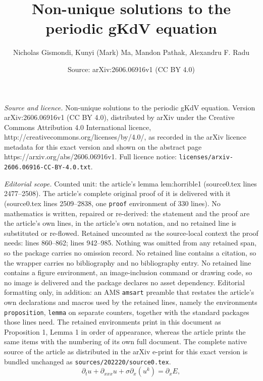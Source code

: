\documentclass[10pt,a4paper]{amsart}
\title{Non-unique solutions to the periodic \textsf{gKdV} equation}
\author{Nicholas Gismondi, Kunyi (Mark) Ma, Mandon Pathak, Alexandru F. Radu}
\date{Source: arXiv:2606.06916v1 (CC BY 4.0)}
\begin{document}
\maketitle

\noindent\emph{Source and licence.} Non-unique solutions to the periodic \textsf{gKdV} equation. Version arXiv:2606.06916v1 (CC BY 4.0), distributed by arXiv under the Creative Commons Attribution 4.0 International licence, http://creativecommons.org/licenses/by/4.0/, as recorded in the arXiv licence metadata for this exact version and shown on the abstract page https://arxiv.org/abs/2606.06916v1. Full licence notice: \texttt{licenses/arxiv-2606.06916-CC-BY-4.0.txt}.\par\smallskip

\noindent\textit{Editorial scope.} Counted unit: the article's lemma lem:horrible1 (source0.tex lines 2477--2508). The article's complete original proof of it is delivered with it (source0.tex lines 2509--2838, one \texttt{proof} environment of 330 lines). No mathematics is written, repaired or re-derived: the statement and the proof are the article's own lines, in the article's own notation, and no retained line is substituted or re-flowed.  Retained uncounted as the source-local context the proof needs: lines 860--862; lines 942--985.  Nothing was omitted from any retained span, so the package carries no omission record.  No retained line contains a citation, so the wrapper carries no bibliography and no bibliography entry.  No retained line contains a figure environment, an image-inclusion command or drawing code, so no image is delivered and the package declares no asset dependency.  Editorial formatting only, in addition: an AMS \texttt{amsart} preamble that restates the article's own declarations and macros used by the retained lines, namely the environments \texttt{proposition}, \texttt{lemma} on separate counters, together with the standard packages those lines need.  The retained environments print in this document as Proposition 1, Lemma 1 in order of appearance, whereas the article prints the same items with the numbering of its own full document.  The complete native source of the article as distributed in the arXiv e-print for this exact version is bundled unchanged as \texttt{sources/202220/source0.tex}.
\begin{equation}\label{eq:relaxed}
    \partial_t u + \partial_{xxx} u + \sigma \partial_x\left(u^k\right) = \partial_x E,
\end{equation}
\end{document}
